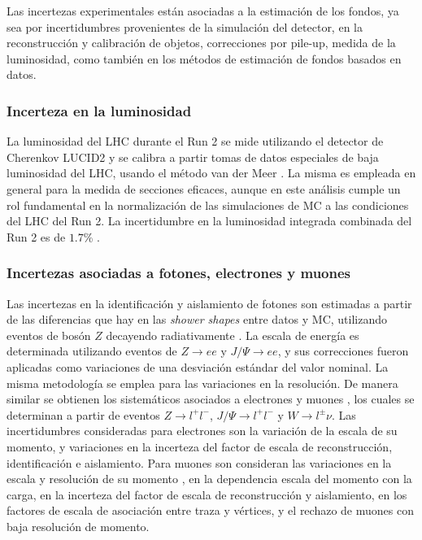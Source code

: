 Las incertezas experimentales están asociadas a la estimación de los fondos, ya sea por incertidumbres provenientes de la simulación del detector, en la reconstrucción y calibración de objetos, correcciones por pile-up, medida de la luminosidad, como también en los métodos de estimación de fondos basados en datos.


\subsubsection{Incerteza en la luminosidad}

La luminosidad del LHC durante el Run 2 se mide utilizando el detector de Cherenkov LUCID2 \cite{lucid2} y se calibra a partir tomas de datos especiales de baja luminosidad del LHC, usando el método van der Meer \cite{vandermeer1,vandermeer2}. La misma es empleada en general para la medida de secciones eficaces, aunque en este análisis cumple un rol fundamental en la normalización de las simulaciones de MC a las condiciones del LHC del Run 2. La incertidumbre en la luminosidad integrada combinada del Run 2 es de $1.7$\% \cite{ATLAS-CONF-2019-021}.


\subsubsection{Incertezas asociadas a fotones, electrones y muones}

Las incertezas en la identificación y aislamiento de fotones son estimadas a partir de las diferencias que hay en las \textit{shower shapes}
entre datos y MC, utilizando eventos de bosón $Z$ decayendo radiativamente \cite{ph_unc1}. La escala de energía es determinada utilizando eventos de $Z\to ee$ y $J/\Psi \to ee$, y sus correcciones fueron aplicadas como variaciones de una desviación estándar del valor nominal. La misma metodología se emplea para las variaciones en la resolución.
De manera similar se obtienen los sistemáticos asociados a electrones \cite{ATLAS-CONF-2014-032} y muones \cite{PERF-2015-10}, los cuales se determinan a partir de eventos $Z\to l^+l^-$, $J/\Psi\to l^+l^-$ y $W\to l^\pm \nu$. 
Las incertidumbres consideradas para electrones son la variación de la escala de su momento, y variaciones en la incerteza del factor de escala de reconstrucción, identificación e aislamiento.
Para muones son consideran las variaciones en la escala y resolución de su momento 
, en la dependencia escala del momento con la carga, en la incerteza del factor de escala de reconstrucción y aislamiento, en los factores de escala de asociación entre traza y vértices, y el rechazo de muones con baja resolución de momento.


